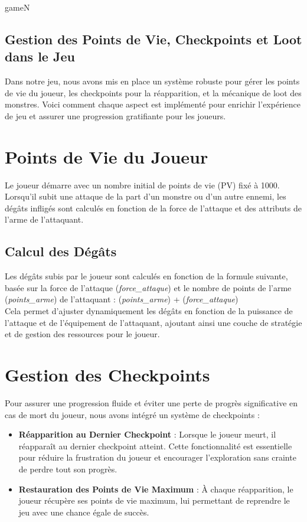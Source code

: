 gameN


\subsection{Gestion des Points de Vie, Checkpoints et Loot dans le Jeu}

Dans notre jeu, nous avons mis en place un système robuste pour gérer les points de vie du joueur, 
les checkpoints pour la réapparition, et la mécanique de loot des monstres. Voici comment chaque aspect 
est implémenté pour enrichir l'expérience de jeu et assurer une progression gratifiante pour les joueurs.

\section*{Points de Vie du Joueur}

Le joueur démarre avec un nombre initial de points de vie (PV) fixé à 1000. Lorsqu'il subit une attaque de la part d'un monstre ou d'un autre ennemi,
 les dégâts infligés sont calculés en fonction de la force de l'attaque et des attributs de l'arme de l'attaquant.

\subsection*{Calcul des Dégâts}

Les dégâts subis par le joueur sont calculés en fonction de la formule suivante, basée sur la force de l'attaque 
(\textit{force\_attaque}) et le nombre de points de l'arme (\textit{points\_arme}) de l'attaquant : (\textit{points\_arme}) + (\textit{force\_attaque})
\\

Cela permet d'ajuster dynamiquement les dégâts en fonction de la puissance de l'attaque et de 
l'équipement de l'attaquant, ajoutant ainsi une couche de stratégie et de gestion des ressources pour le joueur.

\section*{Gestion des Checkpoints}

Pour assurer une progression fluide et éviter une perte de progrès significative en cas de mort du joueur, nous avons intégré un système de checkpoints :
\\

\begin{itemize}
    \item \textbf{Réapparition au Dernier Checkpoint} : Lorsque le joueur meurt, il réapparaît au dernier checkpoint atteint. Cette fonctionnalité est essentielle pour réduire la frustration du joueur et encourager l'exploration sans crainte de perdre tout son progrès.
    \\

    \item \textbf{Restauration des Points de Vie Maximum} : À chaque réapparition, le joueur récupère ses points de vie maximum, lui permettant de reprendre le jeu avec une chance égale de succès.
\end{itemize}

